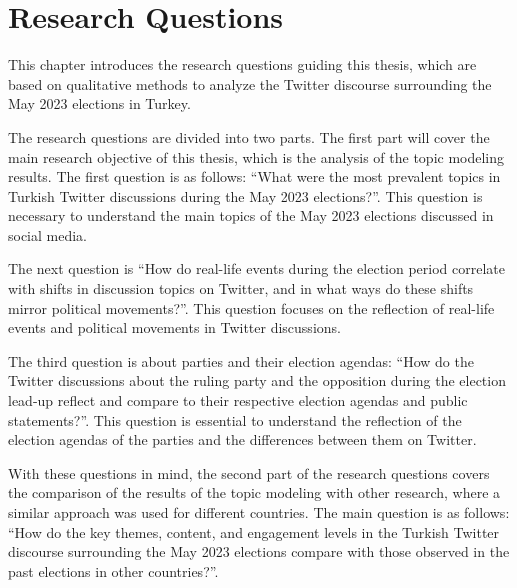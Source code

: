 

\section{Research Questions}

This chapter introduces the research questions guiding this thesis,
which are based on qualitative methods to analyze the Twitter discourse surrounding the May 2023 elections in Turkey.


The research questions are divided into two parts.
The first part will cover the main research objective of this thesis, 
which is the analysis of the topic modeling results. The first question is as follows:
``What were the most prevalent topics in Turkish Twitter discussions during the May 2023 elections?''.
This question is necessary to understand the main topics of the May 2023 elections discussed in social media.

The next question is ``How do real-life events during the election period correlate with shifts in discussion topics on Twitter, 
and in what ways do these shifts mirror political movements?''.
This question focuses on the reflection of real-life events and political movements in Twitter discussions. 

The third question is about parties and their election agendas: 
``How do the Twitter discussions about the ruling party and the opposition during the election lead-up reflect and compare 
to their respective election agendas and public statements?''.
This question is essential to understand the reflection of the election agendas of the parties and the differences between them on Twitter.

With these questions in mind, the second part of the research questions covers the comparison of the results of the topic modeling
with other research, where a similar approach was used for different countries.
The main question is as follows: 
``How do the key themes, content, and engagement levels in the Turkish Twitter discourse surrounding the May 2023 elections
 compare with those observed in the past elections in other countries?''.
